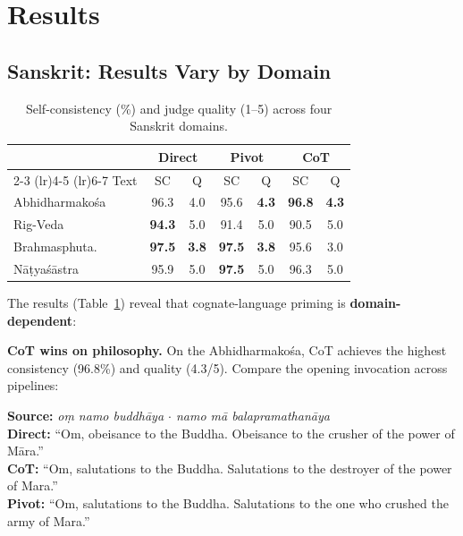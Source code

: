 \documentclass[10pt,twocolumn]{article}
\begin{document}
\section{Results}

\subsection{Sanskrit: Results Vary by Domain}

\begin{table}[H]
\small
\centering
\caption{Self-consistency (\%) and judge quality (1--5) across four Sanskrit domains.}
\label{tab:main}
\begin{tabular}{@{}lcccccc@{}}
\toprule
& \multicolumn{2}{c}{Direct} & \multicolumn{2}{c}{Pivot} & \multicolumn{2}{c}{CoT} \\
\cmidrule(lr){2-3} \cmidrule(lr){4-5} \cmidrule(lr){6-7}
Text & SC & Q & SC & Q & SC & Q \\
\midrule
Abhidharmako\'sa & 96.3 & 4.0 & 95.6 & \textbf{4.3} & \textbf{96.8} & \textbf{4.3} \\
Rig-Veda & \textbf{94.3} & 5.0 & 91.4 & 5.0 & 90.5 & 5.0 \\
Brahmasphuta. & \textbf{97.5} & \textbf{3.8} & \textbf{97.5} & \textbf{3.8} & 95.6 & 3.0 \\
N\=a\d{t}ya\'s\=astra & 95.9 & 5.0 & \textbf{97.5} & 5.0 & 96.3 & 5.0 \\
\bottomrule
\end{tabular}
\end{table}

The results (Table~\ref{tab:main}) reveal that cognate-language priming is \textbf{domain-dependent}:

\textbf{CoT wins on philosophy.} On the Abhidharmako\'sa, CoT achieves the highest consistency (96.8\%) and quality (4.3/5). Compare the opening invocation across pipelines:

{\small
\noindent\textbf{Source:} \emph{o\d{m} namo buddh\=aya $\cdot$ namo m\=a balapramathan\=aya}\\
\textbf{Direct:} ``Om, obeisance to the Buddha. Obeisance to the crusher of the power of M\=ara.''\\
\textbf{CoT:} ``Om, salutations to the Buddha. Salutations to the destroyer of the power of Mara.''\\
\textbf{Pivot:} ``Om, salutations to the Buddha. Salutations to the one who crushed the army of Mara.''
}
\end{document}
